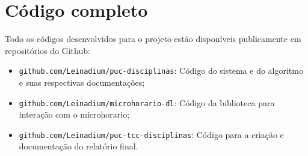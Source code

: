 \section{Código completo}


Todo os códigos desenvolvidos para o projeto estão disponíveis publicamente em repositórios do Github:

\begin{itemize}
    \item \verb|github.com/Leinadium/puc-disciplinas|: Código do sistema e do algoritmo e suas respectivas documentações;
    \item \verb|github.com/Leinadium/microhorario-dl|: Código da biblioteca para interação com o microhorario;
    \item \verb|github.com/Leinadium/puc-tcc-disciplinas|: Código para a criação e documentação do relatório final.
\end{itemize}
